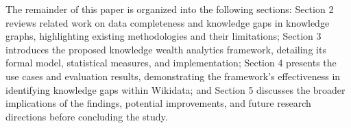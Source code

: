 The remainder of this paper is organized into the following sections: Section 2 reviews related work on data completeness and knowledge gaps in knowledge graphs, highlighting existing methodologies and their limitations; Section 3 introduces the proposed knowledge wealth analytics framework, detailing its formal model, statistical measures, and implementation; Section 4 presents the use cases and evaluation results, demonstrating the framework's effectiveness in identifying knowledge gaps within Wikidata; and Section 5 discusses the broader implications of the findings, potential improvements, and future research directions before concluding the study.